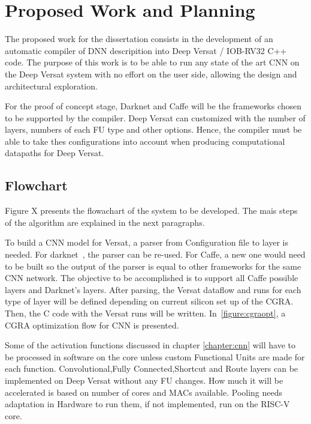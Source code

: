 \chapter{Proposed Work and Planning}
\label{chapter:PWP}

The proposed work for the dissertation consists in the development of an
automatic compiler of DNN descripition into Deep Versat / IOB-RV32 C++ code. The
purpose of this work is to be able to run any state of the art CNN on the Deep
Versat system with no effort on the user side, allowing the design and
architectural exploration.

For the proof of concept stage, Darknet and Caffe will be the frameworks chosen
to be supported by the compiler. Deep Versat can customized with the number of
layers, numbers of each FU type and other options. Hence, the compiler must be
able to take thes configurations into account when producing computational
datapaths for Deep Versat.

\section{Flowchart}

Figure X presents the flowachart of the system to be developed. The mais steps
of the algorithm are explained in the next paragraphs.

To build a CNN model for Versat, a parser from Configuration file to layer is needed. For darknet~\cite{darknet}, the parser can be re-used.
For Caffe, a new one would need to be built so the output of the parser is equal to other frameworks for the same CNN network.
The objective to be accomplished is to support all Caffe possible layers and Darknet's layers.
After parsing, the Versat dataflow and runs for each type of layer will be defined depending on current silicon set up of the CGRA. Then,
the C code with the Versat runs will be written. In~\ref{figure:cgraopt}, a CGRA optimization flow for CNN is presented.

Some of the activation functions discussed in chapter \ref{chapter:cnn}
will have to be processed in software on the core unless custom Functional Units
are made for each function. Convolutional,Fully Connected,Shortcut and Route
layers can be implemented on Deep Versat without any FU changes. How much it
will be accelerated is based on number of cores and MACs available. Pooling
needs adaptation in Hardware to run them, if not implemented, run on the RISC-V
core.

